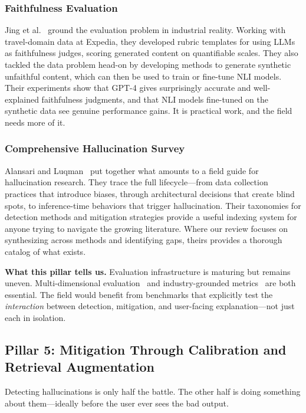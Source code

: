 \documentclass[journal]{IEEEtran}
\begin{document}
\subsubsection{Faithfulness Evaluation}
Jing et al.~\cite{faithfulness} ground the evaluation problem in industrial reality. Working with travel-domain data at Expedia, they developed rubric templates for using LLMs as faithfulness judges, scoring generated content on quantifiable scales. They also tackled the data problem head-on by developing methods to generate synthetic unfaithful content, which can then be used to train or fine-tune NLI models. Their experiments show that GPT-4 gives surprisingly accurate and well-explained faithfulness judgments, and that NLI models fine-tuned on the synthetic data see genuine performance gains. It is practical work, and the field needs more of it.

\subsubsection{Comprehensive Hallucination Survey}
Alansari and Luqman~\cite{survey_alansari} put together what amounts to a field guide for hallucination research. They trace the full lifecycle---from data collection practices that introduce biases, through architectural decisions that create blind spots, to inference-time behaviors that trigger hallucination. Their taxonomies for detection methods and mitigation strategies provide a useful indexing system for anyone trying to navigate the growing literature. Where our review focuses on synthesizing across methods and identifying gaps, theirs provides a thorough catalog of what exists.

\textbf{What this pillar tells us.} Evaluation infrastructure is maturing but remains uneven. Multi-dimensional evaluation~\cite{trustllm} and industry-grounded metrics~\cite{faithfulness} are both essential. The field would benefit from benchmarks that explicitly test the \emph{interaction} between detection, mitigation, and user-facing explanation---not just each in isolation.

\subsection{Pillar 5: Mitigation Through Calibration and Retrieval Augmentation}

Detecting hallucinations is only half the battle. The other half is doing something about them---ideally before the user ever sees the bad output.
\end{document}
